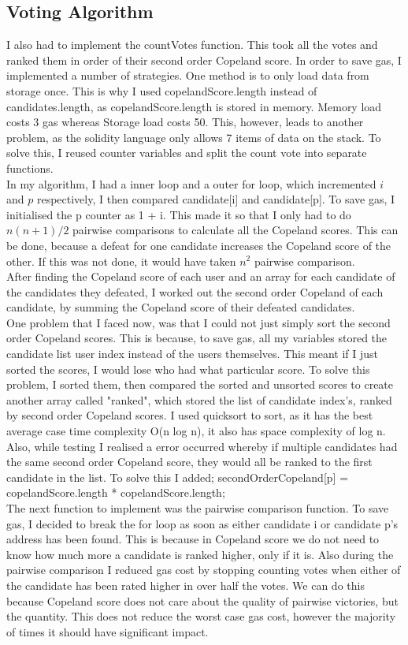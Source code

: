 \subsection{Voting Algorithm}
I also had to implement the countVotes function. This took all the votes and ranked them in order of their second order Copeland score. In order to save gas, I implemented a number of strategies. One method is to only load data from storage once. This is why I used copelandScore.length instead of candidates.length, as copelandScore.length is stored in memory. Memory load costs 3 gas whereas Storage load costs 50. This, however, leads to another problem, as the solidity language only allows 7 items of data on the stack. To solve this, I reused counter variables and split the count vote into separate functions. \\
In my algorithm, I had a inner loop and a outer for loop, which incremented $i$ and $p$ respectively, I then compared candidate[i] and candidate[p]. To save gas, I initialised the p counter as 1 + i. This made it so that I only had to do $n(n+1)/2$ pairwise comparisons to calculate all the Copeland scores. This can be done, because a defeat for one candidate increases the Copeland score of the other. If this was not done, it would have taken $n^2$ pairwise comparison. \\
After finding the Copeland score of each user and an array for each candidate of the candidates they defeated, I worked out the second order Copeland of each candidate, by summing the Copeland score of their defeated candidates. \\
One problem that I faced now, was that I could not just simply sort the second order Copeland scores. This is because, to save gas, all my variables stored the candidate list user index instead of the users themselves. This meant if I just sorted the scores, I would lose who had what particular score. To solve this problem, I sorted them, then compared the sorted and unsorted scores to create another array called "ranked", which stored the list of candidate index’s, ranked by second order Copeland scores. I used quicksort to sort, as it has the best average case time complexity  O(n log n), it also has space complexity of log n. \\
Also, while testing I realised a error occurred whereby if multiple candidates had the same second order Copeland score, they would all be ranked to the first candidate in the list. To solve this I added; secondOrderCopeland[p] = copelandScore.length  * copelandScore.length; \\
The next function to implement was the pairwise comparison function. To save gas, I decided to break the for loop as soon as either candidate i or candidate p's address has been found. This is because in Copeland score we do not need to know how much more a candidate is ranked higher, only if it is. Also during the pairwise comparison I reduced gas cost by stopping counting votes when either of the candidate has been rated higher in over half the votes. We can do this because Copeland score does not care about the quality of pairwise victories, but the quantity. This does not reduce the worst case gas cost, however the majority of times it should have significant impact. \\
